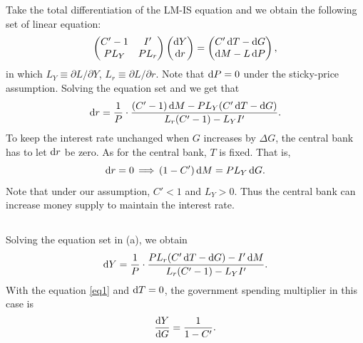 \documentclass{article}
\begin{document}
\section{}
\subsection{}
Take the total differentiation of the LM-IS equation and we obtain the following set of linear equation:
\[
    \begin{pmatrix}
        C' - 1 & I' \\
        P L_Y & P L_r
    \end{pmatrix}
    \begin{pmatrix}
        \dif Y \\ \dif r
    \end{pmatrix} =
    \begin{pmatrix}
        C' \dif T - \dif G \\
        \dif M - L \dif P
    \end{pmatrix},
\]
in which $L_Y \equiv \partial L / \partial Y$, $L_r \equiv \partial L / \partial r$.
Note that $\dif P = 0$ under the sticky-price assumption. Solving the equation set and we get that
\[
    \dif r = \frac{1}{P} \cdot
    \frac{(C' - 1) \dif M - P L_Y (C' \dif T - \dif G)}{L_r (C' - 1) - L_Y I'}.
\]
To keep the interest rate unchanged when $G$ increases by $\Delta G$, the central bank has to let $\dif r$ be zero. As for the central bank, $T$ is fixed. That is,
\begin{equation}
    \dif r = 0 \,\Longrightarrow\,
    (1 - C') \dif M = P L_Y \dif G. \label{eq1}
\end{equation}
Note that under our assumption, $C' < 1$ and $L_Y > 0$. Thus the central bank can increase money supply to maintain the interest rate.

\subsection{}
Solving the equation set in (a), we obtain
\[
    \dif Y = \frac{1}{P} \cdot
    \frac{P L_r (C' \dif T - \dif G) - I' \dif M}{L_r (C' - 1) - L_Y I'}.
\]
With the equation \eqref{eq1} and $\dif T = 0$, the government spending multiplier in this case is
\[
    \frac{\dif Y}{\dif G} = \frac{1}{1 - C'}.
\]

\section{}
\end{document}
